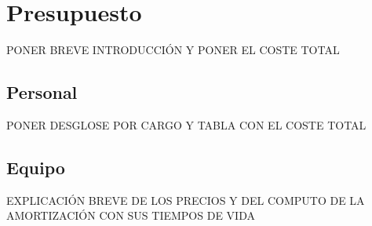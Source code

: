 \section{Presupuesto}
PONER BREVE INTRODUCCIÓN Y PONER EL COSTE TOTAL

\subsection{Personal}
PONER DESGLOSE POR CARGO Y TABLA CON EL COSTE TOTAL

\subsection{Equipo}
EXPLICACIÓN BREVE DE LOS PRECIOS Y DEL COMPUTO DE LA AMORTIZACIÓN CON SUS TIEMPOS DE VIDA\cite{electronic_lifetime}

